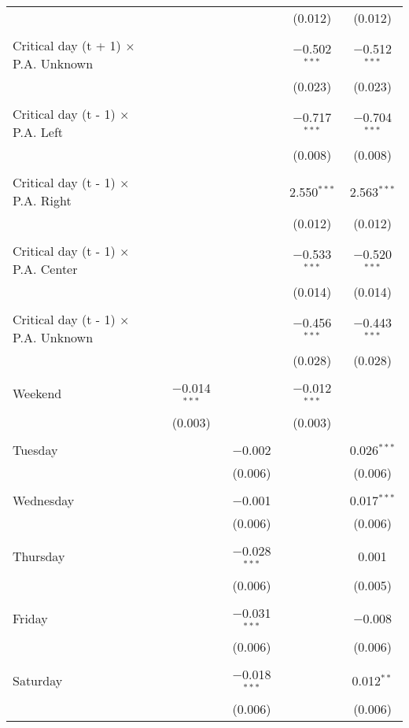 \documentclass[
]{article}
\begin{document}
\begin{table}[!htbp]
{\begin{tabular}{@{\extracolsep{5pt}}lcccc}
  &  &  & (0.012) & (0.012) \\ 
  & & & & \\ 
 Critical day (t + 1) $\times$ P.A. Unknown &  &  & $-$0.502$^{***}$ & $-$0.512$^{***}$ \\ 
  &  &  & (0.023) & (0.023) \\ 
  & & & & \\ 
 Critical day (t - 1) $\times$ P.A. Left &  &  & $-$0.717$^{***}$ & $-$0.704$^{***}$ \\ 
  &  &  & (0.008) & (0.008) \\ 
  & & & & \\ 
 Critical day (t - 1) $\times$ P.A. Right &  &  & 2.550$^{***}$ & 2.563$^{***}$ \\ 
  &  &  & (0.012) & (0.012) \\ 
  & & & & \\ 
 Critical day (t - 1) $\times$ P.A. Center &  &  & $-$0.533$^{***}$ & $-$0.520$^{***}$ \\ 
  &  &  & (0.014) & (0.014) \\ 
  & & & & \\ 
 Critical day (t - 1) $\times$ P.A. Unknown &  &  & $-$0.456$^{***}$ & $-$0.443$^{***}$ \\ 
  &  &  & (0.028) & (0.028) \\ 
  & & & & \\ 
 Weekend & $-$0.014$^{***}$ &  & $-$0.012$^{***}$ &  \\ 
  & (0.003) &  & (0.003) &  \\ 
  & & & & \\ 
 Tuesday &  & $-$0.002 &  & 0.026$^{***}$ \\ 
  &  & (0.006) &  & (0.006) \\ 
  & & & & \\ 
 Wednesday &  & $-$0.001 &  & 0.017$^{***}$ \\ 
  &  & (0.006) &  & (0.006) \\ 
  & & & & \\ 
 Thursday &  & $-$0.028$^{***}$ &  & 0.001 \\ 
  &  & (0.006) &  & (0.005) \\ 
  & & & & \\ 
 Friday &  & $-$0.031$^{***}$ &  & $-$0.008 \\ 
  &  & (0.006) &  & (0.006) \\ 
  & & & & \\ 
 Saturday &  & $-$0.018$^{***}$ &  & 0.012$^{**}$ \\ 
  &  & (0.006) &  & (0.006) \\ 

\end{tabular}}
\end{table}
\end{document}
